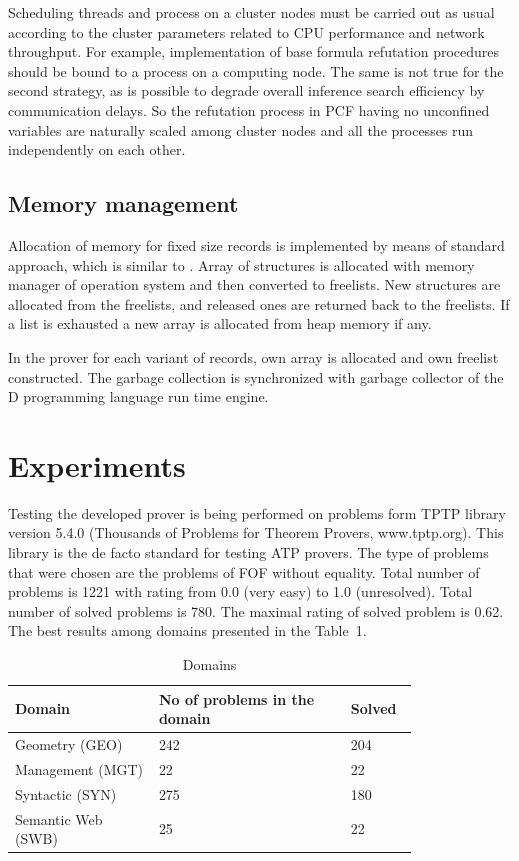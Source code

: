 \documentclass[runningheads,a4paper]{llncs}
\begin{document}
Scheduling threads and process on a cluster nodes must be carried out as usual according to the cluster parameters related to CPU performance and network throughput. For example, implementation of base formula refutation procedures should be bound to a process on a computing node. The same is not true for the second strategy, as is possible to degrade overall inference search efficiency by communication delays. So the refutation process in PCF having no unconfined variables are naturally scaled among cluster nodes and all the processes run independently on each other.

\subsection{Memory management}
Allocation of memory for fixed size records is implemented by means of standard approach, which is similar to \cite{gmemory}. Array of structures is allocated with memory manager of operation system and then converted to freelists. New structures are allocated from the freelists, and released ones are returned back to the freelists. If a list is exhausted a new array is allocated from heap memory if any.

In the prover for each variant of records, own array is allocated and own freelist constructed. The garbage collection is synchronized with garbage collector of the D programming language run time engine.


\section{Experiments}
Testing the developed prover is being performed on problems form TPTP \cite{tptp} library version 5.4.0 (Thousands of Problems for Theorem Provers, www.tptp.org). This library is the de facto standard for testing ATP provers. The type of problems that were chosen are the problems of FOF without equality. Total number of problems is 1221 with rating from 0.0 (very easy) to 1.0 (unresolved). Total number of solved problems is 780. The maximal rating of solved problem is 0.62. The best results among domains presented in the Table~1.

\begin{table}
\caption{Domains}
\begin{tabular}{|p{0.3\linewidth}|p{0.4\linewidth}|p{0.1\linewidth}|}

\hline
\textbf{Domain} & \textbf{No of problems in the domain} & \textbf{Solved} \\
\hline
Geometry (GEO) & 242 & 204 \\
\hline
Management (MGT) & 22 & 22 \\
\hline
Syntactic  (SYN) & 275 & 180 \\
\hline
Semantic Web  (SWB) & 25 & 22 \\
\hline
\end{tabular}
\end{table}
\end{document}

